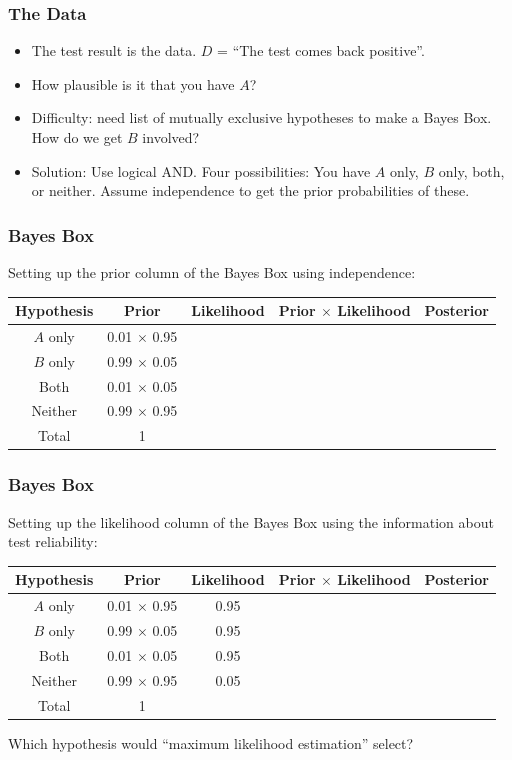 \documentclass{beamer}
\begin{document}
\begin{frame}
\frametitle{The Data}

\begin{itemize}
\item The test result is the data. $D$ = ``The test comes back positive''.\pause
\item How plausible is it that you have $A$? \pause
\item Difficulty: need list of mutually exclusive hypotheses
        to make a Bayes Box. How do we get $B$ involved? \pause
\item Solution: Use logical AND. Four possibilities:
        You have $A$ only, $B$ only, both, or neither.
        Assume independence to get the prior
        probabilities of these.
\end{itemize}

\end{frame}




\begin{frame}
\frametitle{Bayes Box}
Setting up the prior column of the Bayes Box using independence:
\vspace{1em}

\begin{tabular}{|c|c|c|c|c|}
\hline
Hypothesis & Prior & Likelihood & Prior $\times$ Likelihood & Posterior \\
\hline
$A$ only & 0.01 $\times$ 0.95 & & & \\
$B$ only & 0.99 $\times$ 0.05 & & & \\
Both     & 0.01 $\times$ 0.05 & & & \\
Neither  & 0.99 $\times$ 0.95 & & & \\
\hline
Total & 1 & & & \\
\hline
\end{tabular}


\end{frame}


\begin{frame}
\frametitle{Bayes Box}
Setting up the likelihood column of the Bayes Box using the information
about test reliability:
\vspace{1em}

\begin{tabular}{|c|c|c|c|c|}
\hline
Hypothesis & Prior & Likelihood & Prior $\times$ Likelihood & Posterior \\
\hline
$A$ only & 0.01 $\times$ 0.95 & 0.95 & & \\
$B$ only & 0.99 $\times$ 0.05 & 0.95 & & \\
Both     & 0.01 $\times$ 0.05 & 0.95 & & \\
Neither  & 0.99 $\times$ 0.95 & 0.05 & & \\
\hline
Total & 1 & & & \\
\hline
\end{tabular}

\pause
\vspace{0.3em}
Which hypothesis would ``maximum likelihood estimation''
select?


\end{frame}
\end{document}
